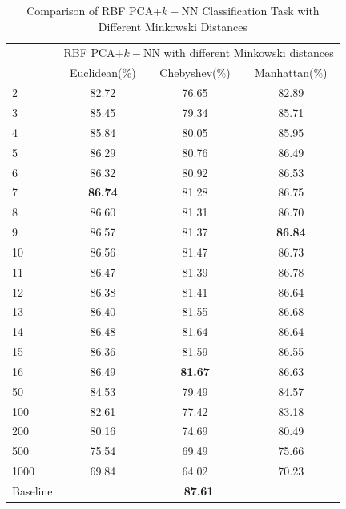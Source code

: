 \documentclass[conference]{IEEEtran}
\begin{document}
\begin{table}[htbp]
	\centering
 	\newcommand{\tabincell}[2]{\begin{tabular}{@{}#1@{}}#2\end{tabular}}
 	\renewcommand\arraystretch{1.0}
 	\caption{Comparison of RBF PCA+$k-$NN Classification Task with Different Minkowski Distances}
 	\label{base1_1}%
 		\begin{tabular}{@{}p{1cm}<{\centering}|c|c|c}
 		\hline
 		\multirow{2}{*}{\diagbox[height=2\line,width=1.42cm,font=\tiny]{$k$}{Acc.}{$\mathit{M}$}} &
 		\multicolumn{3}{c}{RBF PCA+$k-$NN with different Minkowski distances}\\
 		\cline{2-4}
			& Euclidean(\%) & Chebyshev(\%) & Manhattan(\%)\\
 		\hline
 		2   & 82.72 & 76.65 & 82.89 \\
 		3   & 85.45 & 79.34 & 85.71 \\
 		4   & 85.84 & 80.05 & 85.95 \\
 		5   & 86.29 & 80.76 & 86.49 \\
 		6   & 86.32 & 80.92 & 86.53 \\
 		7   & \textbf{86.74} & 81.28 & 86.75 \\
 		8   & 86.60 & 81.31 & 86.70 \\ 
 		9   & 86.57 & 81.37 & \textbf{86.84} \\
 		10   & 86.56 & 81.47 & 86.73 \\
 		11   & 86.47 & 81.39 & 86.78 \\
 		12   & 86.38 & 81.41 & 86.64 \\
 		13   & 86.40 & 81.55 & 86.68 \\
 		14   & 86.48 & 81.64 & 86.64 \\
 		15   & 86.36 & 81.59 & 86.55 \\
		16   & 86.49 & \textbf{81.67} & 86.63 \\
		50   & 84.53 & 79.49 & 84.57 \\
		100   & 82.61 & 77.42 & 83.18 \\
		200   & 80.16 & 74.69 & 80.49 \\
		500   & 75.54 & 69.49 & 75.66 \\
		1000   & 69.84 & 64.02 & 70.23 \\
		\hline
 		Baseline & \multicolumn{3}{c}{\textbf{87.61}} \\
		\hline
		\end{tabular}
\end{table}
\end{document}
